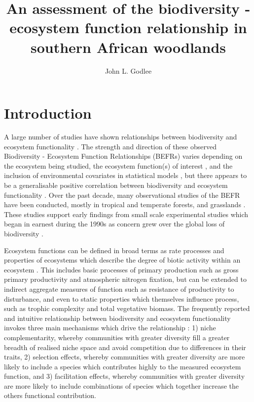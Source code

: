 \documentclass[11pt,a4paper]{article}
\title{An assessment of the biodiversity - ecosystem function relationship in southern African woodlands}
\author{John L. Godlee}
\date{}
\begin{document}
\maketitle
\tableofcontents

\section{Introduction}

A large number of studies have shown relationships between biodiversity and ecosystem functionality \citep{Liang2016, Cardinale2009}. The strength and direction of these observed Biodiversity - Ecosystem Function Relationships (BEFRs) varies depending on the ecosystem being studied, the ecosystem function(s) of interest \citep{Hector2007}, and the inclusion of environmental covariates in statistical models \citep{Vila2005}, but there appears to be a generalisable positive correlation between biodiversity and ecosystem functionality \citep{Liang2016}. Over the past decade, many observational studies of the BEFR have been conducted, mostly in tropical and temperate forests, and grasslands \citep{Chen2011}. These studies support early findings from small scale experimental studies which began in earnest during the 1990s as concern grew over the global loss of biodiversity \citep{Tilman1994, Tilman2014}.

Ecosystem functions can be defined in broad terms as rate processes and properties of ecosystems which describe the degree of biotic activity within an ecosystem \citep{Jax2005}. This includes basic processes of primary production such as gross primary productivity and atmospheric nitrogen fixation, but can be extended to indirect aggregate measures of function such as resistance of productivity to disturbance, and even to static properties which themselves influence process, such as trophic complexity and total vegetative biomass. The frequently reported and intuitive relationship between biodiversity and ecosystem functionality invokes three main mechanisms which drive the relationship \citep{Tilman2014}: 1) niche complementarity, whereby communities with greater diversity fill a greater breadth of realised niche space and avoid competition due to differences in their traits, 2) selection effects, whereby communities with greater diversity are more likely to include a species which contributes highly to the measured ecosystem function, and 3) facilitation effects, whereby communities with greater diversity are more likely to include combinations of species which together increase the others functional contribution.
\end{document}
